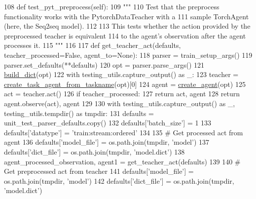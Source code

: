 \begin{DoxyCode}
108     \textcolor{keyword}{def }test\_pyt\_preprocess(self):
109         \textcolor{stringliteral}{"""}
110 \textcolor{stringliteral}{        Test that the preprocess functionality works with the PytorchDataTeacher with a}
111 \textcolor{stringliteral}{        sample TorchAgent (here, the Seq2seq model).}
112 \textcolor{stringliteral}{}
113 \textcolor{stringliteral}{        This tests whether the action provided by the preprocessed teacher is equivalent}
114 \textcolor{stringliteral}{        to the agent's observation after the agent processes it.}
115 \textcolor{stringliteral}{        """}
116 
117         \textcolor{keyword}{def }get\_teacher\_act(defaults, teacher\_processed=False, agent\_to=None):
118             parser = train\_setup\_args()
119             parser.set\_defaults(**defaults)
120             opt = parser.parse\_args()
121             \hyperlink{namespacebuild__dict}{build\_dict}(opt)
122             with testing\_utils.capture\_output() \textcolor{keyword}{as} \_:
123                 teacher = \hyperlink{namespaceparlai_1_1core_1_1agents_ab4473fa54af02b5ab385b41b51dacd10}{create\_task\_agent\_from\_taskname}(opt)[0]
124             agent = \hyperlink{namespaceparlai_1_1core_1_1agents_ad0d54074d4bcc148bb415ab5515a53b5}{create\_agent}(opt)
125             act = teacher.act()
126             \textcolor{keywordflow}{if} teacher\_processed:
127                 \textcolor{keywordflow}{return} act, agent
128             \textcolor{keywordflow}{return} agent.observe(act), agent
129 
130         with testing\_utils.capture\_output() \textcolor{keyword}{as} \_, testing\_utils.tempdir() \textcolor{keyword}{as} tmpdir:
131             defaults = unit\_test\_parser\_defaults.copy()
132             defaults[\textcolor{stringliteral}{'batch\_size'}] = 1
133             defaults[\textcolor{stringliteral}{'datatype'}] = \textcolor{stringliteral}{'train:stream:ordered'}
134 
135             \textcolor{comment}{# Get processed act from agent}
136             defaults[\textcolor{stringliteral}{'model\_file'}] = os.path.join(tmpdir, \textcolor{stringliteral}{'model'})
137             defaults[\textcolor{stringliteral}{'dict\_file'}] = os.path.join(tmpdir, \textcolor{stringliteral}{'model.dict'})
138             agent\_processed\_observation, agent1 = get\_teacher\_act(defaults)
139 
140             \textcolor{comment}{# Get preprocessed act from teacher}
141             defaults[\textcolor{stringliteral}{'model\_file'}] = os.path.join(tmpdir, \textcolor{stringliteral}{'model'})
142             defaults[\textcolor{stringliteral}{'dict\_file'}] = os.path.join(tmpdir, \textcolor{stringliteral}{'model.dict'})

\end{DoxyCode}
